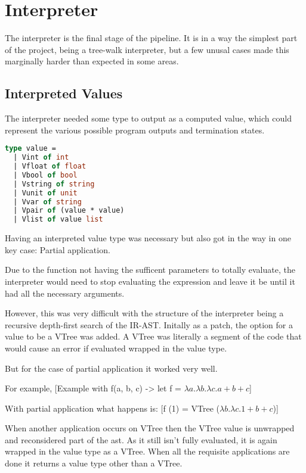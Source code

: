 \documentclass{l4proj}
\begin{document}
\section{Interpreter}

The interpreter is the final stage of the pipeline.
It is in a way the simplest part of the project, being a tree-walk interpreter, but a few unusal cases made this marginally harder than expected in some areas.

\subsection{Interpreted Values}

The interpreter needed some type to output as a computed value, which could represent the various possible program outputs and termination states.

\begin{lstlisting}[language=Caml]
type value = 
  | Vint of int 
  | Vfloat of float
  | Vbool of bool 
  | Vstring of string 
  | Vunit of unit 
  | Vvar of string 
  | Vpair of (value * value)
  | Vlist of value list
\end{lstlisting}

Having an interpreted value type was necessary but also got in the way in one key case: Partial application.

Due to the function not having the sufficent parameters to totally evaluate, the interpreter would need to stop evaluating the expression and leave it be until it had all the necessary arguments.

However, this was very difficult with the structure of the interpreter being a recursive depth-first search of the IR-AST.
Initally as a patch, the option for a value to be a VTree was added.
A VTree was literally a segment of the code that would cause an error if evaluated wrapped in the value type.

But for the case of partial application it worked very well.

For example, [Example with f(a, b, c) -> let f = $\lambda a. \lambda b. \lambda c. a + b + c$]

With partial application what happens is: [f (1) = VTree ($\lambda b. \lambda c. 1 + b + c$)]

When another application occurs on VTree then the VTree value is unwrapped and reconsidered part of the ast.
As it still isn't fully evaluated, it is again wrapped in the value type as a VTree.
When all the requisite applications are done it returns a value type other than a VTree.
\end{document}
